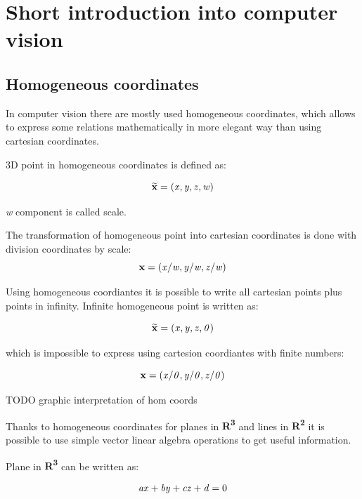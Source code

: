 \documentclass[a4paper,12pt]{report}
\newcommand{\evect}[1]{
{\bf #1}
}
\newcommand{\ehvect}[1]{
{\bf \widetilde{#1}}
}
\newcommand{\escal}[1]{
{\it #1}
}
\newcommand{\eucl}[1]{
{\bf R\textsuperscript{#1}}
}
\begin{document}
\section{Short introduction into computer vision}

\subsection{Homogeneous coordinates}

In computer vision there are mostly used homogeneous coordinates, which allows to express some relations
mathematically in more elegant way than using cartesian coordinates. 

3D point in homogeneous coordinates is defined as:

\begin{equation}
\ehvect{x} = (\escal{x}, \escal{y}, \escal{z}, \escal{w})
\end{equation}

\escal{w} component is called scale.

The transformation of homogeneous point into cartesian coordinates is done with division 
coordinates by scale:
\begin{equation}
\evect{x} = (\escal{x} / \escal{w}, \escal{y} / \escal{w}, \escal{z} / \escal{w})
\end{equation}

Using homogeneous coordiantes it is possible to write all cartesian points plus points in infinity.
Infinite homogeneous point is written as: 

\begin{equation}
\ehvect{x} = (\escal{x}, \escal{y}, \escal{z}, \escal{0})
\end{equation}

which is impossible to express using cartesion coordiantes with finite numbers:

\begin{equation}
\evect{x} = (\escal{x} / \escal{0}, \escal{y} / \escal{0}, \escal{z} / \escal{0})
\end{equation}

TODO graphic interpretation of hom coords 

Thanks to homogeneous coordinates for planes in \eucl{3} and lines in \eucl{2} it is possible to use simple vector linear algebra operations 
to get useful information.

Plane in \eucl{3} can be written as:

\begin{equation}
\escal{a}\escal{x} + \escal{b}\escal{y} + \escal{c}\escal{z} + \escal{d} = 0
\end{equation}
\end{document}
